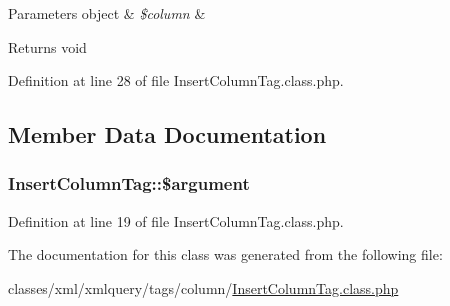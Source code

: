 \begin{DoxyParams}[1]{Parameters}
object & {\em \$column} & \\
\hline
\end{DoxyParams}
\begin{DoxyReturn}{Returns}
void 
\end{DoxyReturn}


Definition at line 28 of file Insert\+Column\+Tag.\+class.\+php.



\subsection{Member Data Documentation}
\hypertarget{classInsertColumnTag_a1aa52b3296f70706efacf27d1a1abc6c}{}
\subsubsection[{\$argument}]{\setlength{\rightskip}{0pt plus 5cm}Insert\+Column\+Tag\+::\$argument}\label{classInsertColumnTag_a1aa52b3296f70706efacf27d1a1abc6c}


Definition at line 19 of file Insert\+Column\+Tag.\+class.\+php.



The documentation for this class was generated from the following file\+:\begin{DoxyCompactItemize}
\item 
classes/xml/xmlquery/tags/column/\hyperlink{InsertColumnTag_8class_8php}{Insert\+Column\+Tag.\+class.\+php}\end{DoxyCompactItemize}
